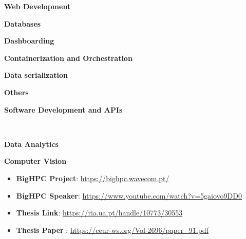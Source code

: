 \documentclass[10pt,a4paper,ragged2e,withhyper]{altacv}
\begin{document}
\begin{paracol}{2}
      \textbf{Web Development} 
      \smallbreak
      \bigbreak

      \textbf{Databases}
      \smallbreak
      \\
      \bigbreak

      \textbf{Dashboarding}
      \smallbreak
     
      \bigbreak

      \textbf{Containerization and Orchestration}
      \smallbreak
      \\
      \bigbreak

      \textbf{Data serialization}
      \smallbreak
      \bigbreak

      \textbf{Others}
      \smallbreak
      \\

   

      \textbf{Software Development and APIs}
      \smallbreak

      \\
      \bigbreak

      \textbf{Data Analytics}
      \smallbreak
      \bigbreak

      \textbf{Computer Vision}
      \smallbreak

      \begin{itemize}
            \item \textbf{BigHPC Project}: \url{https://bighpc.wavecom.pt/}
            \item \textbf{BigHPC Speaker}: \url{https://www.youtube.com/watch?v=5gaiovo9DD0}
            \item \textbf{Thesis Link}: \url{https://ria.ua.pt/handle/10773/30553}
            \item \textbf{Thesis Paper }: \url{https://ceur-ws.org/Vol-2696/paper_91.pdf}
      \end{itemize}

\end{paracol}
\end{document}
